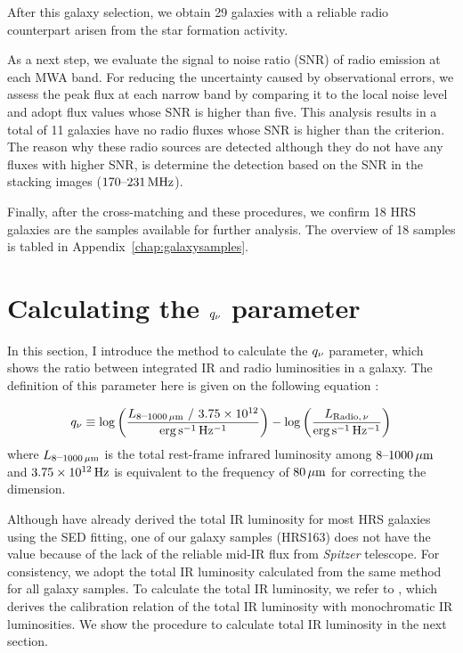 After this galaxy selection, we obtain 29 galaxies with a reliable radio counterpart arisen from the star formation activity.

As a next step, we evaluate the signal to noise ratio (SNR) of radio emission at each MWA band.
For reducing the uncertainty caused by observational errors, we assess the peak flux at each narrow band by comparing it to the local noise level and adopt flux values whose SNR is higher than five.
This analysis results in a total of 11 galaxies have no radio fluxes whose SNR is higher than the criterion.
The reason why these radio sources are detected although they do not have any fluxes with higher SNR, is \citet{Hurley-Walker2017a} determine the detection based on the SNR in the stacking images ($170\mbox{--}231\,\mathrm{MHz}$).

Finally, after the cross-matching and these procedures, we confirm 18 HRS galaxies are the samples available for further analysis.
The overview of 18 samples is tabled in Appendix~\ref{chap:galaxysamples}.



\section{Calculating the $q_{\nu}$ parameter}\label{sec:calculatingq}
In this section, I introduce the method to calculate the $q_{\nu}$ parameter, which shows the ratio between integrated IR and radio luminosities in a galaxy.
The definition of this parameter here is given on the following equation \citep[e.g.,][]{Helou1985, Bell2003, CalistroRivera2017a}:

\begin{equation}\label{eq:q_def}
    q_{\nu} \equiv \log\left(\frac{L_{\mathrm{8\mbox{--}1000\,\mu m}}\ /\ 3.75 \times 10^{12}}{{\rm erg\,s^{-1}\,Hz^{-1}}}\right) - \log\left(\frac{L_{\mathrm{Radio},\,\nu}}{{\rm erg\,s^{-1}\,Hz^{-1}}}\right)
\end{equation}
where $L_{\mathrm{8\mbox{--}1000\,\mu m}}$ is the total rest-frame infrared luminosity among $8 \mbox{--} 1000\,\mathrm{\mu m}$ and $3.75\times10^{12}\,\mathrm{Hz}$ is equivalent to the frequency of $80\,\mathrm{\mu m}$ for correcting the dimension.

Although \citet{Ciesla2014} have already derived the total IR luminosity for most HRS galaxies using the SED fitting, one of our galaxy samples (HRS163) does not have the value because of the lack of the reliable mid-IR flux from {\it Spitzer\/} telescope.
For consistency, we adopt the total IR luminosity calculated from the same method for all galaxy samples.
To calculate the total IR luminosity, we refer to \citet{Galametz2013}, which derives the calibration relation of the total IR luminosity with monochromatic IR luminosities.
We show the procedure to calculate total IR luminosity in the next section.



